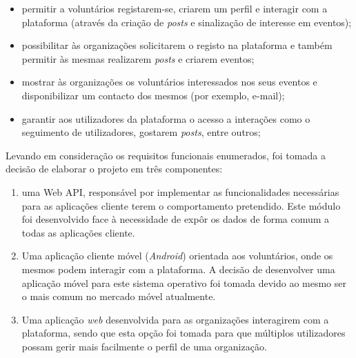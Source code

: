 \begin{itemize}
	\item permitir a voluntários registarem-se, criarem um perfil e interagir com a plataforma (através da criação de \textit{posts} e sinalização de interesse em eventos);
	\item possibilitar às organizações solicitarem o registo na plataforma e também permitir às mesmas realizarem \textit{posts} e criarem eventos;
	\item mostrar às organizações os voluntários interessados nos seus eventos e disponibilizar um contacto dos mesmos (por exemplo, e-mail);
	\item garantir aos utilizadores da plataforma o acesso a interações como o seguimento de utilizadores, gostarem \textit{posts}, entre outros;
\end{itemize}

Levando em consideração os requisitos funcionais enumerados, foi tomada a decisão de elaborar o projeto em três componentes: 
\begin{enumerate}
	\item uma Web API, responsável por implementar as funcionalidades necessárias para as aplicações cliente terem o comportamento pretendido. Este módulo foi desenvolvido face à necessidade de expôr os dados de forma comum a todas as aplicações cliente.
	\item Uma aplicação cliente móvel (\textit{Android}) orientada aos voluntários, onde os mesmos podem interagir com a plataforma.	A decisão de desenvolver uma aplicação móvel para este sistema operativo foi tomada devido ao mesmo ser o mais comum no mercado móvel atualmente.
	\item Uma aplicação \textit{web} desenvolvida para as organizações interagirem com a plataforma, sendo que esta opção foi tomada para que múltiplos utilizadores possam gerir mais facilmente o perfil de uma organização.
\end{enumerate}